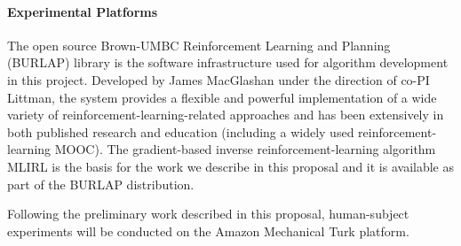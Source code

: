 
\paragraph{Experimental Platforms}


The open source Brown-UMBC Reinforcement Learning and Planning (BURLAP) library is the software infrastructure used for algorithm development in this project. Developed by James MacGlashan under the direction of co-PI Littman, the system provides a flexible and powerful implementation of a wide variety of reinforcement-learning-related approaches and has been extensively in both published research and education (including a widely used reinforcement-learning MOOC). The gradient-based inverse reinforcement-learning algorithm MLIRL is the basis for the work we describe in this proposal and it is available as part of the BURLAP distribution.

Following the preliminary work described in this proposal, human-subject experiments will be conducted on the Amazon Mechanical Turk platform.

